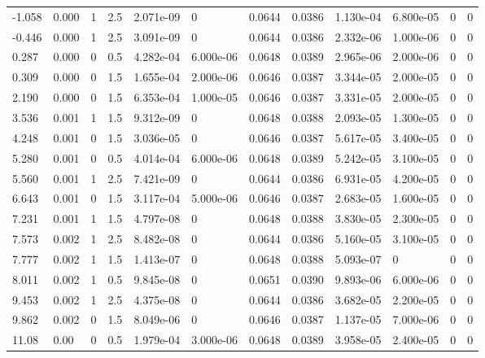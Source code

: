 \documentclass[preview]{standalone}
\begin{document}
{{\begin{tabular}{L{1.2cm}C{1.2cm} C{0.3cm}C{0.5cm} C{1.4cm}C{1.4cm} C{1.4cm}C{1.4cm} C{1.6cm}C{1.6cm} C{1.6cm}C{1.6cm}}
  -1.058  &  0.000  & 1     & 2.5 &  2.071e-09  & 0  &  0.0644&   0.0386& 1.130e-04 & 6.800e-05   &  0 & 0  \\ 
  -0.446  &  0.000  & 1     & 2.5 &  3.091e-09  & 0  &  0.0644&   0.0386& 2.332e-06 & 1.000e-06   &  0 & 0  \\ 
  0.287  &  0.000  & 0     & 0.5 &  4.282e-04  & 6.000e-06  &  0.0648&   0.0389& 2.965e-06 & 2.000e-06   &  0 & 0  \\ 
  0.309  &  0.000  & 0     & 1.5 &  1.655e-04  & 2.000e-06  &  0.0646&   0.0387& 3.344e-05 & 2.000e-05   &  0 & 0  \\ 
  2.190  &  0.000  & 0     & 1.5 &  6.353e-04  & 1.000e-05  &  0.0646&   0.0387& 3.331e-05 & 2.000e-05   &  0 & 0  \\ 
  3.536  &  0.001  & 1     & 1.5 &  9.312e-09  & 0  &  0.0648&   0.0388& 2.093e-05 & 1.300e-05   &  0 & 0  \\ 
  4.248  &  0.001  & 0     & 1.5 &  3.036e-05  & 0  &  0.0646&   0.0387& 5.617e-05 & 3.400e-05   &  0 & 0  \\ 
  5.280  &  0.001  & 0     & 0.5 &  4.014e-04  & 6.000e-06  &  0.0648&   0.0389& 5.242e-05 & 3.100e-05   &  0 & 0  \\ 
  5.560  &  0.001  & 1     & 2.5 &  7.421e-09  & 0  &  0.0644&   0.0386& 6.931e-05 & 4.200e-05   &  0 & 0  \\ 
  6.643  &  0.001  & 0     & 1.5 &  3.117e-04  & 5.000e-06  &  0.0646&   0.0387& 2.683e-05 & 1.600e-05   &  0 & 0  \\ 
  7.231  &  0.001  & 1     & 1.5 &  4.797e-08  & 0  &  0.0648&   0.0388& 3.830e-05 & 2.300e-05   &  0 & 0  \\ 
  7.573  &  0.002  & 1     & 2.5 &  8.482e-08  & 0  &  0.0644&   0.0386& 5.160e-05 & 3.100e-05   &  0 & 0  \\ 
  7.777  &  0.002  & 1     & 1.5 &  1.413e-07  & 0  &  0.0648&   0.0388& 5.093e-07 & 0   &  0 & 0  \\ 
  8.011  &  0.002  & 1     & 0.5 &  9.845e-08  & 0  &  0.0651&   0.0390& 9.893e-06 & 6.000e-06   &  0 & 0  \\ 
  9.453  &  0.002  & 1     & 2.5 &  4.375e-08  & 0  &  0.0644&   0.0386& 3.682e-05 & 2.200e-05   &  0 & 0  \\ 
  9.862  &  0.002  & 0     & 1.5 &  8.049e-06  & 0  &  0.0646&   0.0387& 1.137e-05 & 7.000e-06   &  0 & 0  \\ 
  11.08  &  0.00  & 0     & 0.5 &  1.979e-04  & 3.000e-06  &  0.0648&   0.0389& 3.958e-05 & 2.400e-05   &  0 & 0  \\ 

\end{tabular}}}
\end{document}
